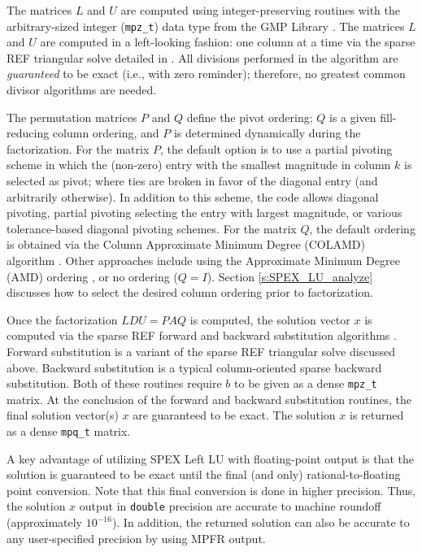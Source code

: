 \documentclass[12pt]{report}
\theoremstyle{definition}
\begin{document}
The matrices $L$ and $U$ are computed using integer-preserving
routines with the arbitrary-sized integer (\verb|mpz_t|) data type from the GMP Library
\cite{granlund2015gnu}. The matrices $L$ and $U$ are computed in a left-looking fashion: one column at a
time via the sparse REF triangular solve
detailed in \cite{lourenco2019exact}. All divisions performed in the algorithm
are \textit{guaranteed} to be exact (i.e., with zero reminder); therefore, no greatest common
divisor algorithms are needed.

The permutation matrices $P$ and $Q$ define the pivot ordering; $Q$ is a given
fill-reducing column ordering, and $P$ is determined dynamically during the
factorization.  For the matrix $P$, the default option is to use a partial
pivoting scheme in which the (non-zero) entry with the smallest magnitude in column $k$ is selected as pivot; where ties are broken in favor of the diagonal entry (and arbitrarily otherwise). In addition to this scheme,
the code allows diagonal pivoting, partial pivoting selecting the entry with largest magnitude, or various tolerance-based diagonal pivoting schemes. For the matrix
$Q$, the default ordering is obtained via the Column Approximate Minimum Degree (COLAMD)
algorithm \cite{davis2004algorithmcolamd,davis2004column}. Other approaches
include using the Approximate Minimum Degree (AMD) ordering
\cite{amestoy1996approximate,amestoy2004algorithmamd}, or no ordering ($Q=I$). Section \ref{s:SPEX_LU_analyze} discusses how to select the desired column ordering prior to factorization.

Once the factorization $L D U = P A Q$ is computed, the solution vector 
$x$ is computed via the sparse REF forward and backward substitution algorithms \cite{lourenco2019exact}. 
Forward substitution is a variant of the sparse REF triangular solve discussed above. Backward substitution is a typical column-oriented sparse backward substitution. Both of these routines require $b$ to be given as a dense \verb|mpz_t| matrix. At the conclusion of the forward and 
backward substitution routines, the final solution vector(s) $x$ are guaranteed to be exact.  The solution $x$ is returned as a dense \verb|mpq_t| matrix.

A key advantage of utilizing SPEX Left LU with floating-point output is that the solution is guaranteed to be exact until the final (and only) rational-to-floating point conversion. Note that this final conversion is done in higher precision. Thus, the solution $x$ output in \verb|double| precision are accurate to machine roundoff (approximately $10^{-16}$). In addition, the returned solution can also be accurate to any user-specified precision by using MPFR output.
\end{document}
